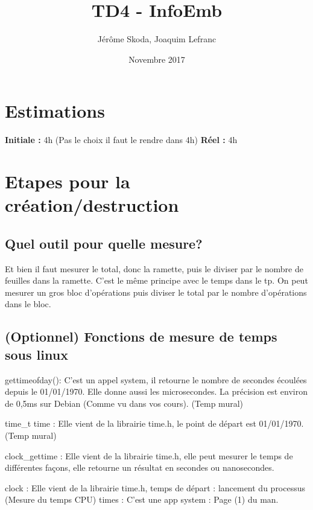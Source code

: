\documentclass[12pt]{article}
\title{TD4 - InfoEmb}
\author{Jérôme Skoda, Joaquim Lefranc}
\date{Novembre 2017}
\begin{document}
\maketitle

\section{Estimations}
\textbf{Initiale :} 4h (Pas le choix il faut le rendre dans 4h)
\textbf{Réel :} 4h 

\section{Etapes pour la création/destruction}

	\subsection{Quel outil pour quelle mesure?}
		Et bien il faut mesurer le total, donc la ramette, puis le diviser par le nombre de feuilles dans la ramette. C'est le même principe avec le temps dans le tp. On peut mesurer un gros bloc d'opérations puis diviser le total par le nombre d'opérations dans le bloc.

	\subsection{(Optionnel) Fonctions de mesure de temps sous linux}

	gettimeofday(): C'est un appel system, il retourne le nombre de secondes écoulées depuis le 01/01/1970. Elle donne aussi les microsecondes. La précision est environ de 0,5ms sur Debian (Comme vu dans vos cours). (Temp mural)
	\newline

	time\_t time : Elle vient de la librairie time.h, le point de départ est 01/01/1970. (Temp mural)
	\newline

	clock\_gettime : Elle vient de la librairie time.h, elle peut mesurer le temps de différentes façons, elle retourne un résultat en secondes ou nanosecondes.
	\newline

	clock : Elle vient de la librairie time.h, temps de départ : lancement du processus (Mesure du temps CPU)
	\newline
	times : C'est une app system : Page (1) du man.
	\newline
\end{document}
